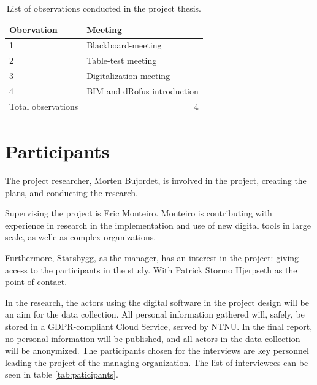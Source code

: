 \begin{table}
    \begin{center}
        \begin{tabular}{p{}p{}}
        \toprule
        \textbf{Obervation} & \textbf{Meeting}       \\ \midrule
        1                   & Blackboard-meeting     \\
        2                   & Table-test meeting     \\
        3                   & Digitalization-meeting \\
        4                   & BIM and dRofus introduction \\
        Total observations  & \multicolumn{1}{r}{4}  \\ \bottomrule
        \end{tabular}
        \caption{List of observations conducted in the project thesis.}
        \label{tab:observations}
    \end{center}
\end{table}

\section{Participants}
The project researcher, Morten Bujordet, is involved in the project, creating the plans, and conducting the research.
	 
Supervising the project is Eric Monteiro. Monteiro is contributing with experience in research in the implementation and use of new digital tools in large scale, as welle as complex organizations. 

Furthermore, Statsbygg, as the manager, has an interest in the project: giving access to the participants in the study. With Patrick Stormo Hjerpseth as the point of contact.
	 
In the research, the actors using the digital software in the project design will be an aim for the data collection. All personal information gathered will, safely, be stored in a GDPR-compliant Cloud Service, served by NTNU. In the final report, no personal information will be published, and all actors in the data collection will be anonymized. The participants chosen for the interviews are key personnel leading the project of the managing organization. The list of interviewees can be seen in table \ref{tab:paticipants}. 


